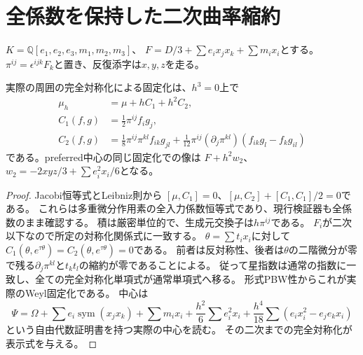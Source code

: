 \section{全係数を保持した二次曲率縮約}
$K=\mathbb Q[e_1,e_2,e_3,m_1,m_2,m_3]$、
$F=D/3+\sum e_ix_jx_k+\sum m_ix_i$とする。
$\pi^{ij}=\epsilon^{ijk}F_k$と置き、反復添字は$x,y,z$を走る。
\begin{lemma}\label{mix:weylsecond}
実際の周囲の完全対称化による固定化は、$h^3=0$上で
\begin{align*}
 \mu_h&=\mu+hC_1+h^2C_2,\\
 C_1(f,g)&=\tfrac12\pi^{ij}f_i g_j,\\
 C_2(f,g)&=\tfrac18\pi^{ij}\pi^{kl}f_{ik}g_{jl}
 +\tfrac1{12}\pi^{ij}(\partial_j\pi^{kl})(f_{ik}g_l-f_kg_{il})
\end{align*}
である。preferred中心の同じ固定化での像は
$F+h^2w_2$、$w_2=-2xyz/3+\sum e_i^2x_i/6$となる。
\end{lemma}
\begin{proof}
Jacobi恒等式とLeibniz則から
$[\mu,C_1]=0$、$[\mu,C_2]+[C_1,C_1]/2=0$である。
これらは多重微分作用素の全入力係数恒等式であり、現行検証器も全係数のまま確認する。
積は厳密単位的で、生成元交換子は$h\pi^{ij}$である。
$F_i$が二次以下なので所定の対称化関係式に一致する。
$\theta=\sum t_ix_i$に対して$C_1(\theta,e^{\tau\theta})=C_2(\theta,e^{\tau\theta})=0$である。
前者は反対称性、後者は$\theta$の二階微分が零で残る$\partial_j\pi^{kl}$と$t_kt_l$の縮約が零であることによる。
従って星指数は通常の指数に一致し、全ての完全対称化単項式が通常単項式へ移る。
形式PBW性からこれが実際のWeyl固定化である。
中心は
\[
 \Psi=\Omega+\sum e_i\operatorname{sym}(x_jx_k)+\sum m_ix_i
 +\frac{h^2}6\sum e_i^2x_i
 +\frac{h^4}{18}\sum(e_ix_i^2-e_je_kx_i)
\]
という自由代数証明書を持つ実際の中心\cite{Pair}を読む。
その二次までの完全対称化が表示式を与える。
\end{proof}

